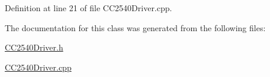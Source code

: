 \-Definition at line 21 of file \-C\-C2540\-Driver.\-cpp.



\-The documentation for this class was generated from the following files\-:\begin{DoxyCompactItemize}
\item 
\hyperlink{_c_c2540_driver_8h}{\-C\-C2540\-Driver.\-h}\item 
\hyperlink{_c_c2540_driver_8cpp}{\-C\-C2540\-Driver.\-cpp}\end{DoxyCompactItemize}
